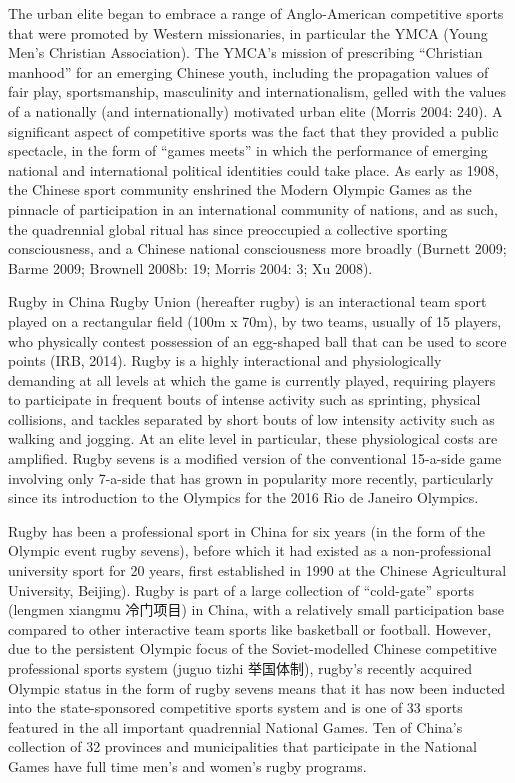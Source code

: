 \documentclass[12pt]{report}
\begin{document}
The urban elite began to embrace a range of Anglo-American competitive sports that were promoted by Western missionaries, in particular the YMCA (Young Men’s Christian Association).  The YMCA’s mission of prescribing “Christian manhood” for an emerging Chinese youth, including the propagation values of fair play, sportsmanship, masculinity and internationalism, gelled with the values of a nationally (and internationally) motivated urban elite (Morris 2004: 240).  A significant aspect of competitive sports was the fact that they provided a public spectacle, in the form of “games meets” in which the performance of emerging national and international political identities could take place.  As early as 1908, the Chinese sport community enshrined the Modern Olympic Games as the pinnacle of participation in an international community of nations, and as such, the quadrennial global ritual has since preoccupied a collective sporting consciousness, and a Chinese national consciousness more broadly (Burnett 2009; Barme 2009; Brownell 2008b: 19; Morris 2004: 3; Xu 2008).

Rugby in China
Rugby Union (hereafter rugby) is an interactional team sport played on a rectangular field (100m x 70m), by two teams, usually of 15 players, who physically contest possession of an egg-shaped ball that can be used to score points (IRB, 2014).  Rugby is a highly interactional and physiologically demanding at all levels at which the game is currently played, requiring players to participate in frequent bouts of intense activity such as sprinting, physical collisions, and tackles separated by short bouts of low intensity activity such as walking and jogging.  At an elite level in particular, these physiological costs are amplified.  Rugby sevens is a modified version of the conventional 15-a-side game involving only 7-a-side that has grown in popularity more recently, particularly since its introduction to the Olympics for the 2016 Rio de Janeiro Olympics.

Rugby has been a professional sport in China for six years (in the form of the Olympic event rugby sevens), before which it had existed as a non-professional university sport for 20 years, first established in 1990 at the Chinese Agricultural University, Beijing).   Rugby is part of a large collection of “cold-gate” sports (lengmen xiangmu 冷门项目) in China, with a relatively small participation base compared to other interactive team sports like basketball or football.  However, due to the persistent Olympic focus of the Soviet-modelled Chinese competitive professional sports system (juguo tizhi 举国体制), rugby’s recently acquired Olympic status in the form of rugby sevens means that it has now been inducted into the state-sponsored competitive sports system and is one of 33 sports featured in the all important quadrennial National Games.  Ten of China’s collection of 32 provinces and municipalities that participate in the National Games have full time men’s and women’s rugby programs.
\end{document}
